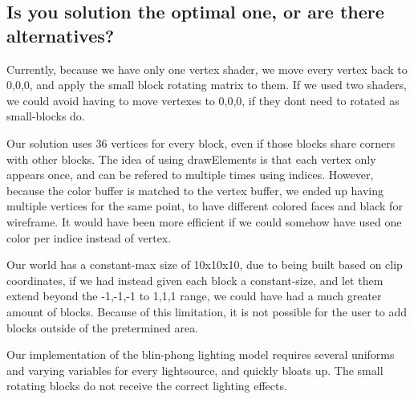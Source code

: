 \subsection{Is you solution the optimal one, or are there alternatives?}

Currently, because we have only one vertex shader, we move every vertex back to 0,0,0, and apply the small block rotating matrix to them.
If we used two shaders, we could avoid having to move vertexes to 0,0,0, if they dont need to rotated as small-blocks do.

Our solution uses 36 vertices for every block, even if those blocks share corners with other blocks.
The idea of using drawElements is that each vertex only appears once, 
and can be refered to multiple times using indices.
However, because the color buffer is matched to the vertex buffer, 
we ended up having multiple vertices for the same point, 
to have different colored faces and black for wireframe.
It would have been more efficient if we could somehow have used one color per indice instead of vertex.

Our world has a constant-max size of 10x10x10, due to being built based on clip coordinates, 
if we had instead given each block a constant-size, and let them extend beyond the -1,-1,-1 to 1,1,1 range, 
we could have had a much greater amount of blocks. Because of this limitation, it is not possible for the user to add blocks outside of the pretermined area.

Our implementation of the blin-phong lighting model requires several uniforms and varying variables for every lightsource, and quickly bloats up.
The small rotating blocks do not receive the correct lighting effects.